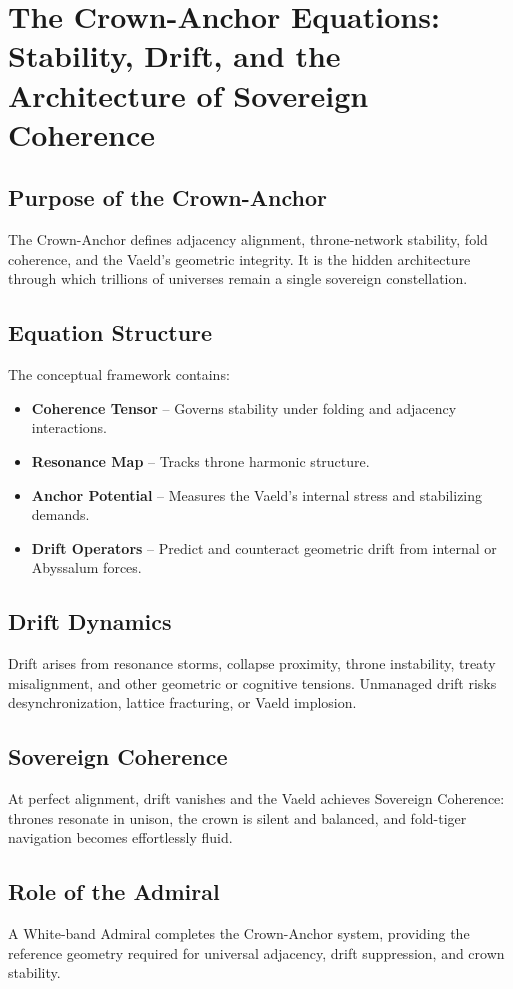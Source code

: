 
\chapter{The Crown-Anchor Equations: Stability, Drift, and the Architecture of Sovereign Coherence}

\section{Purpose of the Crown-Anchor}
The Crown-Anchor defines adjacency alignment, throne-network stability, fold coherence, and the Vaeld’s geometric integrity. It is the hidden architecture through which trillions of universes remain a single sovereign constellation.

\section{Equation Structure}
The conceptual framework contains:
\begin{itemize}
    \item \textbf{Coherence Tensor} – Governs stability under folding and adjacency interactions.
    \item \textbf{Resonance Map} – Tracks throne harmonic structure.
    \item \textbf{Anchor Potential} – Measures the Vaeld’s internal stress and stabilizing demands.
    \item \textbf{Drift Operators} – Predict and counteract geometric drift from internal or Abyssalum forces.
\end{itemize}

\section{Drift Dynamics}
Drift arises from resonance storms, collapse proximity, throne instability, treaty misalignment, and other geometric or cognitive tensions. Unmanaged drift risks desynchronization, lattice fracturing, or Vaeld implosion.

\section{Sovereign Coherence}
At perfect alignment, drift vanishes and the Vaeld achieves Sovereign Coherence: thrones resonate in unison, the crown is silent and balanced, and fold-tiger navigation becomes effortlessly fluid.

\section{Role of the Admiral}
A White-band Admiral completes the Crown-Anchor system, providing the reference geometry required for universal adjacency, drift suppression, and crown stability.

